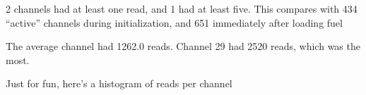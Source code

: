 2 channels had at least one read, and 1 had at least five.  
This compares with 434 ``active'' channels during initialization, and 651 immediately after loading fuel

The average channel had 1262.0 reads. 
Channel 29 had 2520 reads, which was the most.

Just for fun, here's a histogram of reads per channel\\
